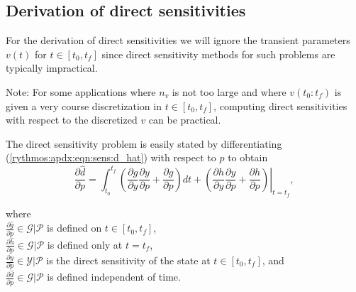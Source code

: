 \documentclass[pdf,ps2pdf,11pt]{SANDreport}
\begin{document}
\subsection{Derivation of direct sensitivities}
\label{rythmos:app:direct-sens-derivation}

For the derivation of direct sensitivities we will ignore the
transient parameters $v(t)$ for $t\in[t_0,t_f]$ since direct
sensitivity methods for such problems are typically impractical.

Note: For some applications where $n_v$ is not too large and where
$v(t_0:t_f)$ is given a very course discretization in $t\in[t_0,t_f]$,
computing direct sensitivities with respect to the discretized $v$ can
be practical.

The direct sensitivity problem is easily stated by differentiating
(\ref{rythmos:apdx:eqn:sens:d_hat}) with respect to $p$ to obtain
%
\begin{equation}
\frac{\partial \hat{d}}{\partial p} 
= \int_{t_0}^{t_f} \left( \frac{\partial g}{\partial y} \frac{\partial y}{\partial p} +  \frac{\partial g}{\partial p} \right) dt
+ \left. \left(  \frac{\partial h}{\partial y} \frac{\partial y}{\partial p} + \frac{\partial h}{\partial p} \right) \right|_{t=t_f},
\label{rythmos:apdx:eqn:sens:d_d_hat_d_p}
\end{equation}
\begin{tabbing}
\hspace{4ex}where\hspace{1ex}\= \\
\>	$\frac{\partial \hat{g}}{\partial p} \in \mathcal{G}|\mathcal{P}$ is defined on $t\in[t_0,t_f]$, \\
\>	$\frac{\partial \hat{h}}{\partial p} \in \mathcal{G}|\mathcal{P}$ is defined only at $t=t_f$, \\
\>	$\frac{\partial y}{\partial p} \in \mathcal{Y}|\mathcal{P}$ is the direct sensitivity of the state
    at $t\in[t_0,t_f]$, and \\
\>	$\frac{\partial \hat{d}}{\partial p} \in \mathcal{G}|\mathcal{P}$ is defined independent of time.
\end{tabbing}
\end{document}
